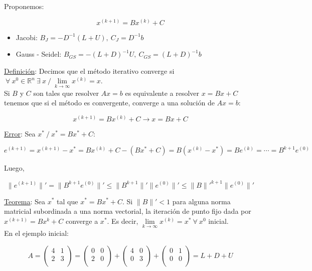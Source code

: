 Proponemos:

$$x^{(k + 1)} = Bx^{(k)} + C$$

\begin{itemize}
	\item Jacobi: $B_{J} = -D^{-1}(L + U),\ C_{J} = D^{-1}b$
	
	\item Gauss - Seidel: $B_{GS} = -(L + D)^{-1}U,\ C_{GS} = (L + D)^{-1}b$
\end{itemize}

\underline{Definici\'on}: Decimos que el m\'etodo iterativo converge si $\ \forall \ x^{0} \in \mathbb{R}^{n}\ \exists \ x\ / \ \lim \limits_{k \rightarrow \infty} x^{(k)} = x$.\\

Si $B$ y $C$ son tales que resolver $Ax = b$ es equivalente a resolver $x = Bx + C$ tenemos que si el m\'etodo es convergente, converge a una soluci\'on de $Ax = b$:

$$x^{(k + 1)} = Bx^{(k)} + C \rightarrow x = Bx + C$$

\underline{Error}: Sea $x^{*}\ / \ x^{*} = Bx^{*} + C$:

$$e^{(k + 1)} = x^{(k + 1)} - x^{*} = Bx^{(k)} + C - (Bx^{*} + C) = B(x^{(k)} - x^{*}) = Be^{(k)} = \cdots = B^{k + 1}e^{(0)}$$

Luego,

$$\|e^{(k + 1)}\|' = \|B^{k + 1}e^{(0)}\|' \leq \|B^{k + 1}\|'\|e^{(0)}\|' \leq \|B\|'^{k + 1}\|e^{(0)}\|'$$

\underline{Teorema}: Sea $x^{*}$ tal que $x^{*} = Bx^{*} + C$. Si $\|B\|' < 1$ para alguna norma matricial subordinada a una norma vectorial, la iteraci\'on de punto fijo dada por $x^{(k + 1)} = Bx^{k} + C$ converge a $x^{*}$. Es decir, $\lim \limits_{k \rightarrow \infty} x^{(k)} = x^{*}\ \forall \ x^{0}$ inicial.\\

En el ejemplo inicial:

$$ A =
	\begin{pmatrix}
        4 & 1\\
        2 & 3\\
	\end{pmatrix}
	=
    \begin{pmatrix}
        0 & 0\\
        2 & 0\\
	\end{pmatrix}
	+
	\begin{pmatrix}
        4 & 0\\
        0 & 3\\
	\end{pmatrix}
	+
	\begin{pmatrix}
        0 & 1\\
        0 & 0\\
	\end{pmatrix}
	= L + D + U
$$

